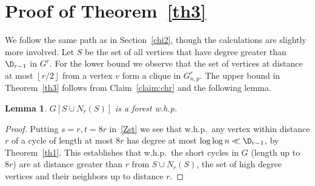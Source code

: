 \documentclass[12pt,a4paper]{article}
\newtheorem{lemma}[theorem]{Lemma}
\newcommand{\rdown}[1]{{\left\lfloor #1\right \rfloor}}
\def\Dr{\D_{r-1}}
\theoremstyle{plain}
\begin{document}
\section{Proof of Theorem~\ref{th3}}\label{chir}
We follow the same path as in Section~\ref{chi2}, though the calculations are  slightly more involved.  Let $S$ be the set of all vertices that have degree greater than $\Dr$ in $G^r$. For the lower bound we observe that the set of vertices at distance at most $\rdown{r/2}$ from a vertex $v$ form a clique in $G_{n,p}^{r}$. The upper bound in Theorem~\ref{th3} follows from Claim~\ref{claim:chr} and the following lemma.
\begin{lemma}\label{lem2a}
	$G[S\cup N_r(S)]$ is a forest w.h.p.
\end{lemma}
\begin{proof} 
Putting $s=r,t=8r$ in~\eqref{Zst} we see that w.h.p.~any vertex within distance $r$ of a cycle of length at most $8r$ has degree at most $\log\log n\ll \D_{r-1}$, by Theorem~\ref{th1}. This establishes that w.h.p.~the short cycles in $G$ (length up to $8r$) are at distance greater than $r$ from $S \cup N_r(S)$, the set of high degree vertices and their neighbors up to distance $r$. 
	

\end{proof}
\end{document}
